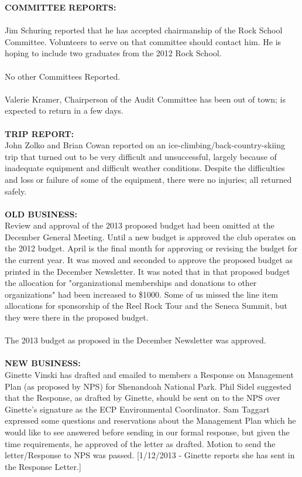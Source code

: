 \documentclass[10pt,a4paper]{article}
\begin{document}
\begin{multicols}{2}
\textbf{COMMITTEE REPORTS:} 
\\
\\
Jim Schuring reported that he has accepted chairmanship of the Rock School Committee. Volunteers to serve on that committee should contact him.  He is hoping to include two graduates from the 2012 Rock School.
\\
\\
No other Committees Reported.
\\
\\
Valerie Kramer, Chairperson of the Audit Committee has been out of town; is expected to return in a few days.
\\
\\
\textbf{TRIP REPORT:}\\
John Zolko and Brian Cowan reported on an ice-climbing/back-country-skiing trip that turned out to be very difficult and unsuccessful, largely because of inadequate equipment and difficult weather conditions.  Despite the difficulties and loss or failure of some of the equipment, there were no injuries; all returned safely.
\\
\\
\textbf{OLD BUSINESS:}\\
Review and approval of the 2013 proposed budget had been omitted at the December General Meeting.   Until a new budget is approved the club operates on the 2012 budget.  April is the final month for approving or revising the budget for the current year.  It was moved and seconded to approve the proposed budget as printed in the December Newsletter.  It was noted that in that proposed budget the allocation for "organizational memberships and donations to other organizations" had been increased to \$1000.  Some of us missed the line item allocations for sponsorship of the Reel Rock Tour and the Seneca Summit, but they were there in the proposed budget.\\
\\
The 2013 budget as proposed in the December Newsletter was approved.
\\
\\
\textbf{NEW BUSINESS:}\\
Ginette Vinski has drafted and emailed to members a Response on Management Plan (as proposed by NPS) for Shenandoah National Park.   Phil Sidel suggested that the Response, as drafted by Ginette, should be sent on to the NPS over Ginette's signature as the ECP Environmental Coordinator.  Sam Taggart expressed some questions and reservations about the Management Plan which he would like to see answered before sending in our formal response, but given the time requirements, he approved of the letter as drafted.   Motion to send the letter/Response to NPS was passed.  [1/12/2013 - Ginette reports she has sent in the Response Letter.]

\end{multicols}
\end{document}
